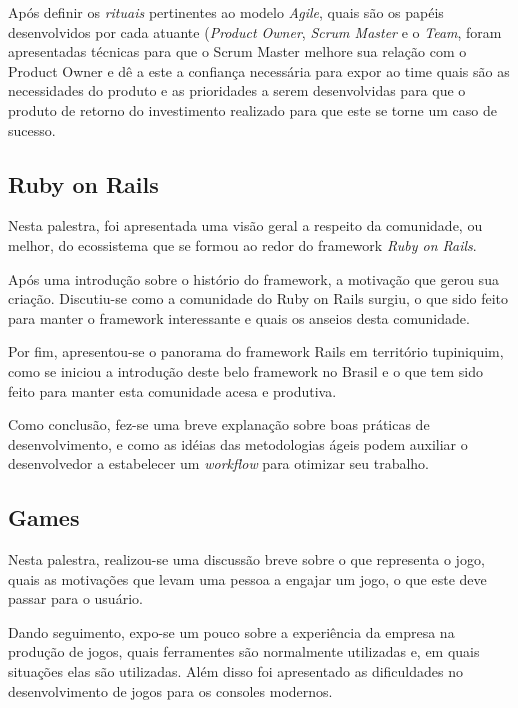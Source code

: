 \documentclass[a4paper]{report}
\begin{document}
            Após definir os \emph{rituais} pertinentes ao modelo \emph{Agile},
            quais são os papéis desenvolvidos por cada atuante (\emph{Product Owner},
            \emph{Scrum Master} e o \emph{Team}, foram apresentadas técnicas
            para que o Scrum Master melhore sua relação com o Product Owner
            e dê a este a confiança necessária para expor ao time quais são
            as necessidades do produto e as prioridades a serem desenvolvidas
            para que o produto de retorno do investimento realizado para que
            este se torne um caso de sucesso.

            \subsection{Ruby on Rails}
            Nesta palestra, foi apresentada uma visão geral a respeito da
            comunidade, ou melhor, do ecossistema que se formou ao redor do
            framework \emph{Ruby on Rails}.

            Após uma introdução sobre o histório do framework, a motivação
            que gerou sua criação. Discutiu-se como a comunidade do Ruby
            on Rails surgiu, o que sido feito para manter o framework
            interessante e quais os anseios desta comunidade.

            Por fim, apresentou-se o panorama do framework Rails em território
            tupiniquim, como se iniciou a introdução deste belo framework
            no Brasil e o que tem sido feito para manter esta comunidade
            acesa e produtiva.

            Como conclusão, fez-se uma breve explanação sobre boas práticas
            de desenvolvimento, e como as idéias das metodologias ágeis
            podem auxiliar o desenvolvedor a estabelecer um \emph{workflow}
            para otimizar seu trabalho.

            \subsection{Games}
            Nesta palestra, realizou-se uma discussão breve sobre o que
            representa o jogo, quais as motivações que levam uma pessoa a
            engajar um jogo, o que este deve passar para o usuário.

            Dando seguimento, expo-se um pouco sobre a experiência da empresa
            na produção de jogos, quais ferramentes são normalmente
            utilizadas e, em quais situações elas são utilizadas. Além disso
            foi apresentado as dificuldades no desenvolvimento de jogos
            para os consoles modernos.
\end{document}
